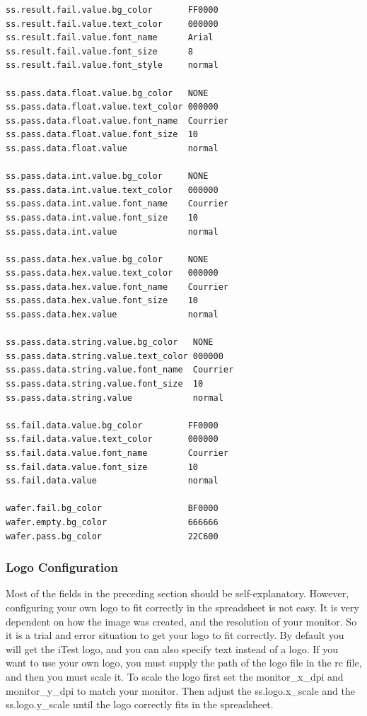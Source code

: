 \documentclass[letterpaper]{article}
\begin{document}
\begin{verbatim}
ss.result.fail.value.bg_color       FF0000
ss.result.fail.value.text_color     000000
ss.result.fail.value.font_name      Arial
ss.result.fail.value.font_size      8
ss.result.fail.value.font_style     normal

ss.pass.data.float.value.bg_color   NONE
ss.pass.data.float.value.text_color 000000
ss.pass.data.float.value.font_name  Courrier
ss.pass.data.float.value.font_size  10
ss.pass.data.float.value            normal

ss.pass.data.int.value.bg_color     NONE
ss.pass.data.int.value.text_color   000000
ss.pass.data.int.value.font_name    Courrier
ss.pass.data.int.value.font_size    10
ss.pass.data.int.value              normal

ss.pass.data.hex.value.bg_color     NONE
ss.pass.data.hex.value.text_color   000000
ss.pass.data.hex.value.font_name    Courrier
ss.pass.data.hex.value.font_size    10
ss.pass.data.hex.value              normal

ss.pass.data.string.value.bg_color   NONE
ss.pass.data.string.value.text_color 000000
ss.pass.data.string.value.font_name  Courrier
ss.pass.data.string.value.font_size  10
ss.pass.data.string.value            normal

ss.fail.data.value.bg_color         FF0000
ss.fail.data.value.text_color       000000
ss.fail.data.value.font_name        Courrier
ss.fail.data.value.font_size        10
ss.fail.data.value                  normal

wafer.fail.bg_color                 BF0000
wafer.empty.bg_color                666666
wafer.pass.bg_color                 22C600
\end{verbatim}
\clearpage

\subsubsection{Logo Configuration}
Most of the fields in the preceding section should be self-explanatory.
However, configuring your own logo to fit correctly in the spreadsheet
is not easy.  It is very dependent on how the image was created,
and the resolution of your monitor.  So it is a trial and error
situation to get your logo to fit correctly.  By default you will
get the iTest logo, and you can also specify text instead of a logo.
If you want to use your own logo, you must supply the path of the logo
file in the rc file, and then you must scale it.  To scale the logo
first set the monitor\_x\_dpi and monitor\_y\_dpi to match your monitor.
Then adjust the ss.logo.x\_scale and the ss.logo.y\_scale until the 
logo correctly fits in the spreadsheet.
\end{document}
